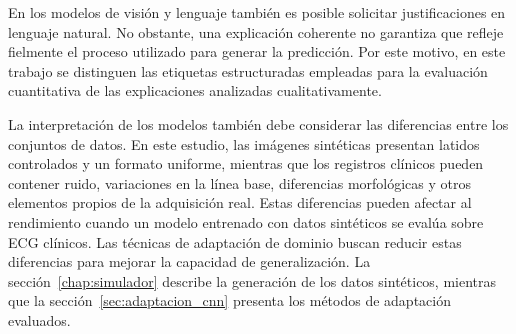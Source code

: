 En los modelos de visión y lenguaje también es posible solicitar justificaciones en lenguaje natural. No obstante, una explicación coherente no garantiza que refleje fielmente el proceso utilizado para generar la predicción. Por este motivo, en este trabajo se distinguen las etiquetas estructuradas empleadas para la evaluación cuantitativa de las explicaciones analizadas cualitativamente.

La interpretación de los modelos también debe considerar las diferencias entre los conjuntos de datos. En este estudio, las imágenes sintéticas presentan latidos controlados y un formato uniforme, mientras que los registros clínicos pueden contener ruido, variaciones en la línea base, diferencias morfológicas y otros elementos propios de la adquisición real. Estas diferencias pueden afectar al rendimiento cuando un modelo entrenado con datos sintéticos se evalúa sobre ECG clínicos. Las técnicas de adaptación de dominio buscan reducir estas diferencias para mejorar la capacidad de generalización. La sección~\ref{chap:simulador} describe la generación de los datos sintéticos, mientras que la sección~\ref{sec:adaptacion_cnn} presenta los métodos de adaptación evaluados.
